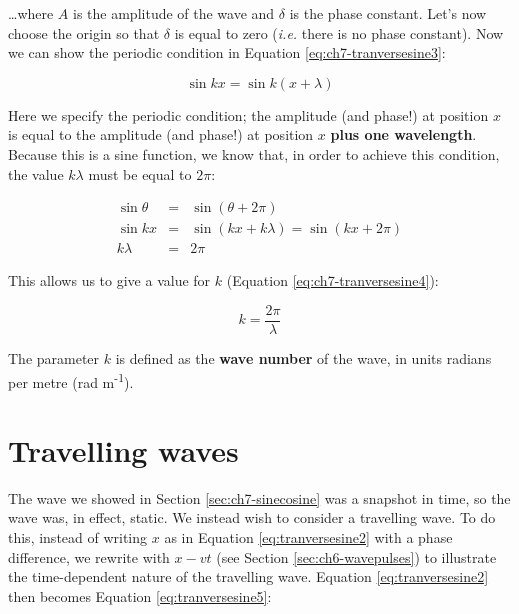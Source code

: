 \documentclass[
]{book}
\begin{document}
\ldots where \(A\) is the amplitude of the wave and \(\delta\) is the phase constant. Let's now choose the origin so that \(\delta\) is equal to zero (\emph{i.e.} there is no phase constant). Now we can show the periodic condition in Equation \eqref{eq:ch7-tranversesine3}:

\begin{equation}
\sin kx = \sin k(x+\lambda)
\label{eq:ch7-tranversesine3}
\end{equation}

Here we specify the periodic condition; the amplitude (and phase!) at position \(x\) is equal to the amplitude (and phase!) at position \(x\) \textbf{plus one wavelength}. Because this is a sine function, we know that, in order to achieve this condition, the value \(k\lambda\) must be equal to \(2\pi\):

\begin{equation}
\begin{array}{rcl}
\sin \theta &=& \sin \left( \theta + 2\pi \right)\\
\sin kx &=& \sin \left( kx + k\lambda\right) = \sin \left( kx + 2\pi \right) \\
k\lambda &=& 2\pi
\end{array}
\label{eq:ch7-tranvsersesine3b}
\end{equation}

This allows us to give a value for \(k\) (Equation \eqref{eq:ch7-tranversesine4}):

\begin{equation}
k = \frac{2\pi}{\lambda}
\label{eq:ch7-tranversesine4}
\end{equation}

The parameter \(k\) is defined as the \textbf{wave number} of the wave, in units radians per metre (rad m\textsuperscript{-1}).

\hypertarget{sec:ch7-travellingwaves}{%
\section{Travelling waves}\label{sec:ch7-travellingwaves}}

The wave we showed in Section \ref{sec:ch7-sinecosine} was a snapshot in time, so the wave was, in effect, static. We instead wish to consider a travelling wave. To do this, instead of writing \(x\) as in Equation \eqref{eq:tranversesine2} with a phase difference, we rewrite with \(x - vt\) (see Section \ref{sec:ch6-wavepulses}) to illustrate the time-dependent nature of the travelling wave. Equation \eqref{eq:tranversesine2} then becomes Equation \eqref{eq:tranversesine5}:
\end{document}
